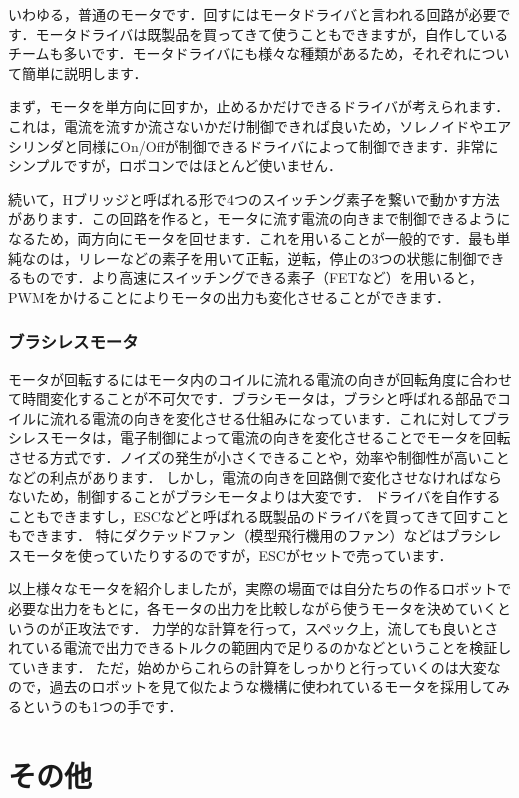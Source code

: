 いわゆる，普通のモータです．回すにはモータドライバと言われる回路が必要です．モータドライバは既製品を買ってきて使うこともできますが，自作しているチームも多いです．モータドライバにも様々な種類があるため，それぞれについて簡単に説明します．

まず，モータを単方向に回すか，止めるかだけできるドライバが考えられます．これは，電流を流すか流さないかだけ制御できれば良いため，ソレノイドやエアシリンダと同様にOn/Offが制御できるドライバによって制御できます．非常にシンプルですが，ロボコンではほとんど使いません．

続いて，Hブリッジと呼ばれる形で4つのスイッチング素子を繋いで動かす方法があります．この回路を作ると，モータに流す電流の向きまで制御できるようになるため，両方向にモータを回せます．これを用いることが一般的です．最も単純なのは，リレーなどの素子を用いて正転，逆転，停止の3つの状態に制御できるものです．より高速にスイッチングできる素子（FETなど）を用いると，PWMをかけることによりモータの出力も変化させることができます．


\subsubsection{ブラシレスモータ}

モータが回転するにはモータ内のコイルに流れる電流の向きが回転角度に合わせて時間変化することが不可欠です．ブラシモータは，ブラシと呼ばれる部品でコイルに流れる電流の向きを変化させる仕組みになっています．これに対してブラシレスモータは，電子制御によって電流の向きを変化させることでモータを回転させる方式です．ノイズの発生が小さくできることや，効率や制御性が高いことなどの利点があります．
しかし，電流の向きを回路側で変化させなければならないため，制御することがブラシモータよりは大変です．
ドライバを自作することもできますし，ESCなどと呼ばれる既製品のドライバを買ってきて回すこともできます．
特にダクテッドファン（模型飛行機用のファン）などはブラシレスモータを使っていたりするのですが，ESCがセットで売っています．

以上様々なモータを紹介しましたが，実際の場面では自分たちの作るロボットで必要な出力をもとに，各モータの出力を比較しながら使うモータを決めていくというのが正攻法です．
力学的な計算を行って，スペック上，流しても良いとされている電流で出力できるトルクの範囲内で足りるのかなどということを検証していきます．
ただ，始めからこれらの計算をしっかりと行っていくのは大変なので，過去のロボットを見て似たような機構に使われているモータを採用してみるというのも1つの手です．


\section{その他}

